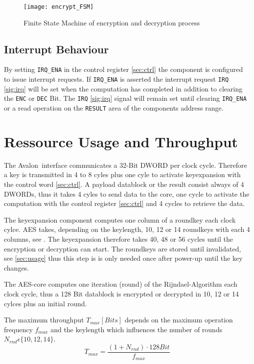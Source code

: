 \documentclass{ruschidoc}
\begin{document}
\begin{figure}[!ht]
  \centering
  \texttt{[image: encrypt\_FSM]}
  \caption{Finite State Machine of encryption and decryption process}
  \label{fig:aesFSM}
\end{figure}


\subsection{Interrupt Behaviour}
\label{sec:irq}
By setting \texttt{IRQ\_ENA} in the control register \ref{sec:ctrl} the
component is configured to issue interrupt requests.
If \texttt{IRQ\_ENA} is asserted the interrupt request \texttt{IRQ} \ref{sig:irq} will be set when the
computation has completed in addition to clearing the \texttt{ENC} or \texttt{DEC}
Bit.
The \texttt{IRQ} \ref{sig:irq}  signal will remain set until clearing \texttt{IRQ\_ENA}
or a read operation on the \texttt{RESULT} area of the components address range. 


\section{Ressource Usage and Throughput}
\label{sec:ressources}

The Avalon\rtm\ interface communicates a 32-Bit DWORD per clock cycle. Therefore a key is transmitted in 4 to 8 cyles
plus one cyle to activate keyexpansion with the control word \ref{sec:ctrl}. A payload datablock or the result consist
always of 4 DWORDs, thus it takes 4 cyles to send data to the core, one cycle to activate the computation with the
control register \ref{sec:ctrl} and 4 cycles to retrieve the data.

The keyexpansion component computes one column of a roundkey each clock cylce. AES takes, depending on the keylength,
10, 12 or 14 roundkeys with each 4 columns, see \cite{NIST:Fips197}. The keyexpansion therefore takes 40, 48 or 56
cycles until the encryption or decryption can start. The roundkeys are stored until invalidated, see \ref{sec:usage}
thus this step is is only needed once after power-up until the key changes.

The AES-core computes one iteration (round) of the Rijndael-Algorithm each clock cycle, thus a 128 Bit datablock is
encrypted or decrypted in 10, 12 or 14 cylces plus an initial round.

The maximum throughput $T_{max}[Bits]$ depends on the maximum operation frequency $f_{max}$ and the keylength which
influences the number of rounds $N_{rnd} \epsilon \lbrace 10,12,14 \rbrace $.
\begin{equation}
  T_{max}=\frac{ (1+N_{rnd}) \cdot 128 Bit}{f_{max}} 
\label{eqn:tmax}
\end{equation}
\end{document}
